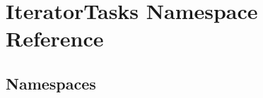 \hypertarget{namespace_iterator_tasks}{}\section{Iterator\+Tasks Namespace Reference}
\label{namespace_iterator_tasks}
\subsection*{Namespaces}
\begin{DoxyCompactItemize}
\end{DoxyCompactItemize}
